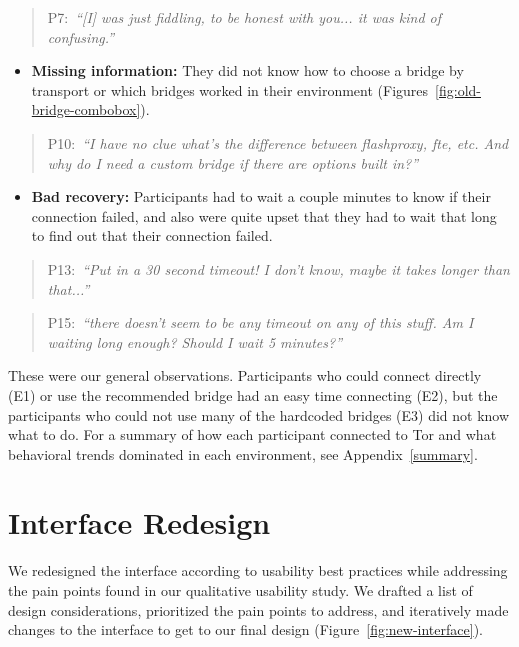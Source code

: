 \documentclass[USenglish,oneside,twocolumn]{article}
\newcommand{\pquote}[2]{
\begin{quotation}
\noindent #1:~\textit{#2}
\end{quotation}
}
\begin{document}
\pquote{P7}{``[I] was just fiddling, to be honest with you... it was kind of confusing.''}

\begin{itemize}
\item {\bfseries Missing information:} They did not know how to choose a bridge by transport or which bridges worked in their environment (Figures~\ref{fig:old-bridge-combobox}).
\end{itemize} 

\pquote{P10}{``I have no clue what's the difference between flashproxy, fte, etc. And why do I need a custom bridge if there are options built in?''}

\begin{itemize}
\item {\bfseries Bad recovery:} Participants had to wait a couple minutes to know if their connection failed, and also were quite upset that they had to wait that long to find out that their connection failed.
\end{itemize} 

\pquote{P13}{``Put in a 30 second timeout! I don't know, maybe it takes longer than that...''}

\pquote{P15}{``there doesn't seem to be any timeout on any of this stuff. Am I waiting long enough? Should I wait 5 minutes?''}

These were our general observations. Participants who could connect directly (E1) or use the recommended bridge had an easy time connecting (E2), but the participants who could not use many of the hardcoded bridges (E3) did not know what to do. For a summary of how each participant connected to Tor and what behavioral trends dominated in each environment, see Appendix~\ref{summary}. 

\section{Interface Redesign}
\label{sec:design} 
We redesigned the interface according to usability best practices while addressing the pain points found in our qualitative usability study. We drafted a list of design considerations, prioritized the pain points to address, and iteratively made changes to the interface to get to our final design (Figure~\ref{fig:new-interface}).
\end{document}

